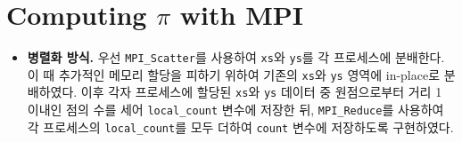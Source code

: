 \section{Computing $\pi$ with MPI}

\begin{itemize}

    \item {
        \textbf{병렬화 방식.}
        우선 \texttt{MPI\_Scatter}를 사용하여 \texttt{xs}와 \texttt{ys}를 각 프로세스에 분배한다.
        이 때 추가적인 메모리 할당을 피하기 위하여 기존의 \texttt{xs}와 \texttt{ys} 영역에 in-place로 분배하였다.
        이후 각자 프로세스에 할당된 \texttt{xs}와 \texttt{ys} 데이터 중 원점으로부터 거리 1 이내인 점의 수를 세어
        \texttt{local\_count} 변수에 저장한 뒤, \texttt{MPI\_Reduce}를 사용하여
        각 프로세스의 \texttt{local\_count}를 모두 더하여 \texttt{count} 변수에 저장하도록 구현하였다.

    }

\end{itemize}